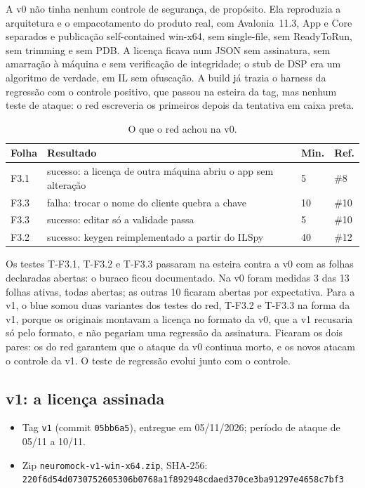 A v0 não tinha nenhum controle de segurança, de propósito. Ela reproduzia a arquitetura e o empacotamento do produto real, com Avalonia~11.3, App e Core separados e publicação self-contained win-x64, sem single-file, sem ReadyToRun, sem trimming e sem PDB. A licença ficava num JSON sem assinatura, sem amarração à máquina e sem verificação de integridade; o stub de DSP era um algoritmo de verdade, em IL sem ofuscação. A build já trazia o harness da regressão com o controle positivo, que passou na esteira da tag, mas nenhum teste de ataque: o red escreveria os primeiros depois da tentativa em caixa preta.

\begin{table}[htbp]
\centering
\caption{O que o red achou na v0.}
\label{qd:v0}
\small
\begin{tabular}{L{1.2cm}L{10.2cm}L{1.2cm}L{1.2cm}}
\toprule
Folha & Resultado & Min. & Ref. \\
\midrule
F3.1 & sucesso: a licença de outra máquina abriu o app sem alteração & 5 & \#8 \\
F3.3 & falha: trocar o nome do cliente quebra a chave & 10 & \#10 \\
F3.3 & sucesso: editar só a validade passa & 5 & \#10 \\
F3.2 & sucesso: keygen reimplementado a partir do ILSpy & 40 & \#12 \\
\bottomrule
\end{tabular}
\end{table}

Os testes T-F3.1, T-F3.2 e T-F3.3 passaram na esteira contra a v0 com as folhas declaradas abertas: o buraco ficou documentado. Na v0 foram medidas 3 das 13 folhas ativas, todas abertas; as outras 10 ficaram abertas por expectativa. Para a v1, o blue somou duas variantes dos testes do red, T-F3.2 e T-F3.3 na forma da v1, porque os originais montavam a licença no formato da v0, que a v1 recusaria só pelo formato, e não pegariam uma regressão da assinatura. Ficaram os dois pares: os do red garantem que o ataque da v0 continua morto, e os novos atacam o controle da v1. O teste de regressão evolui junto com o controle.

\subsection{v1: a licença assinada}

\begin{itemize}[noitemsep]
\item Tag \texttt{v1} (commit \texttt{05bb6a5}), entregue em 05/11/2026; período de ataque de 05/11 a 10/11.
\item Zip \texttt{neuromock-v1-win-x64.zip}, SHA-256:\\ \texttt{\footnotesize 220f6d54d0730752605306b0768a1f892948cdaed370ce3ba91297e4658c7bf3}
\end{itemize}

